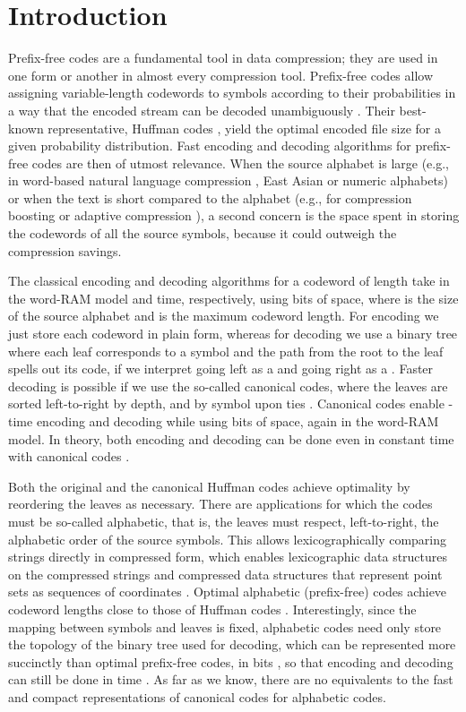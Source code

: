 \documentclass[preprint,12pt]{elsarticle}
\begin{document}
\section{Introduction}
\label{sec:introduction}

Prefix-free codes are a fundamental tool in data compression;
they are used in one form or another in almost every compression tool. 
Prefix-free codes allow assigning variable-length codewords to symbols 
according to their probabilities in a way that the encoded stream can be
decoded unambiguously \cite[Ch.\ 5]{CT06}. Their best-known representative, 
Huffman codes \cite{Huf52}, yield the optimal encoded file size for a given 
probability distribution. Fast encoding and decoding algorithms for prefix-free 
codes are then of utmost relevance. When the source alphabet is large (e.g., in
word-based natural language compression \cite{Mof89,ZMNBY00}, East Asian or
numeric alphabets) or when the text is short compared to the alphabet (e.g.,
for compression boosting \cite{FGMS05} or adaptive compression \cite{BFNP07}),
a second concern is the space spent in storing the codewords of all the source 
symbols, because it could outweigh the compression savings.

The classical encoding and decoding algorithms for a codeword of length  take in the word-RAM model  and  time, respectively, using 
bits of space, where  is the size of the source alphabet and  is
the maximum codeword length. For encoding we just store each codeword in plain 
form, whereas for decoding we use a binary tree  where each leaf corresponds
to a symbol and the path from the root to the leaf spells out its code, if we 
interpret going left as a  and going right as a . Faster decoding is 
possible if we use the so-called canonical codes, where the leaves are sorted 
left-to-right by depth, and by symbol upon ties \cite{SK64}. Canonical codes 
enable -time encoding and decoding while using 
 bits of space, again in the word-RAM model. 
In theory, both encoding and decoding 
can be done even in constant time with canonical codes \cite{GNNO15}.

Both the original and the canonical Huffman codes achieve optimality by 
reordering the leaves as necessary. There are applications for which the 
codes must be so-called alphabetic, that is, the leaves must respect, 
left-to-right, the alphabetic order of the source symbols. This allows
lexicographically comparing strings directly in compressed form, which enables
lexicographic data structures on the compressed strings \cite{BNO12,MPBCCN15}
and compressed data structures that represent point sets as sequences of 
coordinates \cite{Nav14}. Optimal alphabetic (prefix-free) codes achieve 
codeword lengths close to those of Huffman 
codes \cite{HT71}. Interestingly, since the mapping between symbols and leaves 
is fixed, alphabetic codes need only store the topology of the binary tree 
 used for decoding, which can be represented more succinctly than optimal 
prefix-free codes, in  bits \cite{MR01}, so that encoding and 
decoding can still be done in time  \cite{GNNO15}. As far as we 
know, there are no equivalents to the fast and compact representations of 
canonical codes for alphabetic codes.
\end{document}
